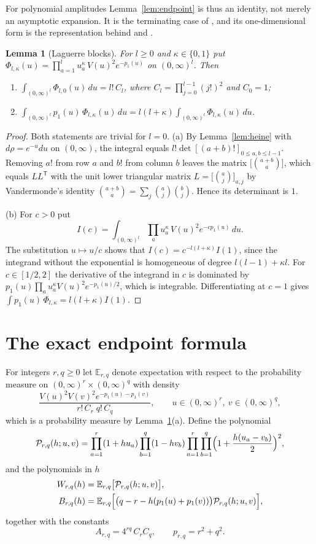 \documentclass[11pt]{amsart}
\newtheorem{lemma}[theorem]{Lemma}
\theoremstyle{remark}
\numberwithin{equation}{section}
\newcommand{\E}{\mathbb{E}}
\begin{document}
For polynomial amplitudes Lemma~\ref{lem:endpoint} is thus an identity, not merely an asymptotic expansion. It is the terminating case of \cite[Proposition~3.2]{CDHI}, and its one-dimensional form is the representation behind \cite[Lemma~3.4]{MC} and \cite[(5)]{ADHW}.

\begin{lemma}[Laguerre blocks]\label{lem:laguerre}
For $l\ge0$ and $\kappa\in\{0,1\}$ put $\Phi_{l,\kappa}(u)=\prod_{a=1}^lu_a^\kappa\,V(u)^2e^{-p_1(u)}$ on $(0,\infty)^l$. Then
\begin{enumerate}
\item[(a)] $\int_{(0,\infty)^l}\Phi_{l,0}(u)\,du=l!\,C_l$, where $C_l=\prod_{j=0}^{l-1}(j!)^2$ and $C_0=1$;
\item[(b)] $\int_{(0,\infty)^l}p_1(u)\,\Phi_{l,\kappa}(u)\,du=l(l+\kappa)\int_{(0,\infty)^l}\Phi_{l,\kappa}(u)\,du$.
\end{enumerate}
\end{lemma}

\begin{proof}
Both statements are trivial for $l=0$. (a) By Lemma~\ref{lem:heine} with $d\rho=e^{-u}du$ on $(0,\infty)$, the integral equals $l!\det[(a+b)!]_{0\le a,b\le l-1}$. Removing $a!$ from row $a$ and $b!$ from column $b$ leaves the matrix $\bigl[\binom{a+b}{a}\bigr]$, which equals $LL^{\mathsf T}$ with the unit lower triangular matrix $L=\bigl[\binom{a}{j}\bigr]_{a,j}$ by Vandermonde's identity $\binom{a+b}{a}=\sum_j\binom aj\binom bj$. Hence its determinant is $1$.

(b) For $c>0$ put
\[
I(c)=\int_{(0,\infty)^l}\prod_au_a^\kappa\,V(u)^2e^{-cp_1(u)}\,du .
\]
The substitution $u\mapsto u/c$ shows that $I(c)=c^{-l(l+\kappa)}I(1)$, since the integrand without the exponential is homogeneous of degree $l(l-1)+\kappa l$. For $c\in[1/2,2]$ the derivative of the integrand in $c$ is dominated by $p_1(u)\prod_au_a^\kappa V(u)^2e^{-p_1(u)/2}$, which is integrable. Differentiating at $c=1$ gives $\int p_1(u)\,\Phi_{l,\kappa}=l(l+\kappa)I(1)$.
\end{proof}

\section{The exact endpoint formula}\label{sec:clusters}

For integers $r,q\ge0$ let $\E_{r,q}$ denote expectation with respect to the probability measure on $(0,\infty)^r\times(0,\infty)^q$ with density
\[
\frac{V(u)^2V(v)^2e^{-p_1(u)-p_1(v)}}{r!\,C_r\;q!\,C_q},\qquad u\in(0,\infty)^r,\ v\in(0,\infty)^q,
\]
which is a probability measure by Lemma~\ref{lem:laguerre}(a). Define the polynomial
\[
\mathcal P_{r,q}(h;u,v)=\prod_{a=1}^r(1+hu_a)\prod_{b=1}^q(1-hv_b)\prod_{a=1}^r\prod_{b=1}^q\Bigl(1+\frac{h(u_a-v_b)}2\Bigr)^2,
\]
and the polynomials in $h$
\begin{align*}
W_{r,q}(h)&=\E_{r,q}\bigl[\mathcal P_{r,q}(h;u,v)\bigr],\\
B_{r,q}(h)&=\E_{r,q}\Bigl[\bigl(q-r-h(p_1(u)+p_1(v))\bigr)\mathcal P_{r,q}(h;u,v)\Bigr],
\end{align*}
together with the constants
\[
A_{r,q}=4^{rq}\,C_rC_q,\qquad p_{r,q}=r^2+q^2 .
\]
\end{document}
